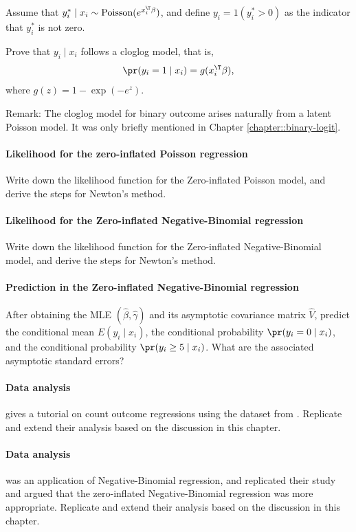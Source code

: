 Assume that $y_{i}^* \mid x_{i}\sim\text{Poisson}(e^{x_{i}^{\T}\beta})$,
and define $y_{i}=1(y_{i}^*>0)$ as the indicator that $y_{i}^*$ is
not zero. 

Prove that $y_{i} \mid x_{i}$ follows a cloglog model, that
is,
\[
\pr(y_{i} =1\mid x_{i})=g(x_{i}^{\T}\beta),
\]
where $g(z)=1-\exp(-e^{z})$. 

Remark: The cloglog model for binary outcome arises naturally from a latent Poisson model. It was only briefly mentioned in Chapter \ref{chapter::binary-logit}. 



\paragraph{Likelihood for the zero-inflated Poisson regression}

Write down the likelihood function for the Zero-inflated Poisson model,
and derive the steps for Newton's method. 

\paragraph{Likelihood for the Zero-inflated Negative-Binomial regression}

Write down the likelihood function for the Zero-inflated Negative-Binomial model, and
derive the steps for Newton's method. 


\paragraph{Prediction in the Zero-inflated Negative-Binomial regression}

After obtaining the MLE $(\hat{\beta}, \hat{\gamma})$ and its asymptotic covariance matrix $\hat{V}$, predict the conditional mean $E(y_i \mid x_i)$, the conditional probability $\pr(y_i=0\mid x_i)$, and the conditional probability $\pr(y_i \geq 5\mid x_i)$. What are the associated asymptotic standard errors? 


\paragraph{Data analysis}

\citet{zeileis2008regression} gives a tutorial on count outcome regressions using the dataset from \citet{deb1997demand}. Replicate and extend their analysis based on the discussion in this chapter. 
 
 
\paragraph{Data analysis} 


\citet{fisman2007corruption} was an application of Negative-Binomial regression, and \citet{albergaria2017narrow} replicated their study and argued that the zero-inflated Negative-Binomial regression was more appropriate. Replicate and extend their analysis based on the discussion in this chapter. 
